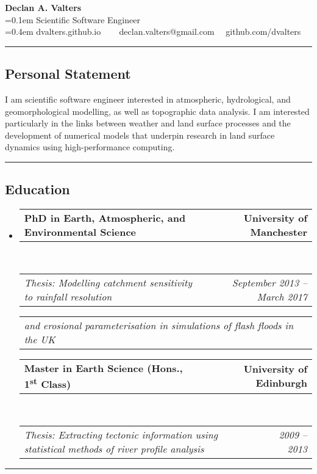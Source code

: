 \documentclass[10.5pt,a4]{article}
\makeatletter
\newcommand{\headerrow}[2]
{\begin{tabular*}{\linewidth}{l@{\extracolsep{\fill}}r}
	#1 &
	#2 \\
\end{tabular*}}
\makeatother
\begin{document}
\begin{center}
{\LARGE \textbf{Declan A. Valters}} \\
\parskip=0.1em
{Scientific Software Engineer} \\
\parskip=0.4em
dvalters.github.io  \ \textbullet
\ \ declan.valters@gmail.com \ \textbullet \ github.com/dvalters
\end{center}


\hrule
\vspace{-0.4em}
\subsection*{Personal Statement}
I am scientific software engineer interested in atmospheric, hydrological, and geomorphological modelling, as well as topographic data analysis. I am interested particularly in the links between weather and land surface processes and the development of numerical models that underpin research in land surface dynamics using high-performance computing.
\vspace{1em}

\hrule
\vspace{-0.4em}
\subsection*{Education}
\begin{itemize}
	\parskip=0.1em
	
	\item 
	\headerrow
		{\textbf{PhD in Earth, Atmospheric, and Environmental Science}}
		{\textbf{University of Manchester}}
	\\
	\headerrow
		{\emph{Thesis: Modelling catchment sensitivity to rainfall resolution}}
		{\emph{September 2013 -- March 2017}}
		\headerrow
		  {\emph{and erosional parameterisation in simulations of flash floods in the UK}}

	\item 
	\headerrow
		{\textbf{Master in Earth Science (Hons., 1\textsuperscript{st} Class)} }
		{\textbf{University of Edinburgh}}
	\\
	\headerrow
		{\emph{Thesis: Extracting tectonic information using statistical methods of river profile analysis}}
		{\emph{2009 -- 2013}}
\end{itemize}

\hrule
\vspace{-0.4em}
\end{document}
